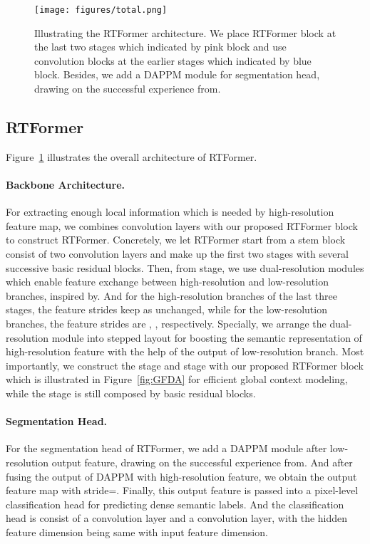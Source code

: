 \documentclass{article}
\begin{document}
\begin{figure}
\texttt{[image: figures/total.png]}
    \caption{Illustrating the RTFormer architecture. We place RTFormer block at the last two stages which indicated by pink block and use convolution blocks at the earlier stages which indicated by blue block. Besides, we add a DAPPM module for segmentation head, drawing on the successful experience from\cite{hong2021deep}.}
    \label{fig:RTFormer}
\end{figure}


\subsection{RTFormer}

Figure~\ref{fig:RTFormer} illustrates the overall architecture of RTFormer.

\vspace{-2mm}
\paragraph{Backbone Architecture.}
For extracting enough local information which is needed by high-resolution feature map, we combines convolution layers with our proposed RTFormer block to construct RTFormer. Concretely, we let RTFormer start from a stem block consist of two  convolution layers and make up the first two stages with several successive basic residual blocks\cite{he2016deep}. Then, from stage, we use dual-resolution modules which enable feature exchange between high-resolution and low-resolution branches, inspired by\cite{hong2021deep}. And for the high-resolution branches of the last three stages, the feature strides keep as  unchanged, while for the low-resolution branches, the feature strides are , ,  respectively. Specially, we arrange the dual-resolution module into stepped layout for boosting the semantic representation of high-resolution feature with the help of the output of low-resolution branch. Most importantly, we construct the stage and stage with our proposed RTFormer block which is illustrated in Figure~\ref{fig:GFDA} for efficient global context modeling, while the stage is still composed by basic residual blocks.

\vspace{-2mm}
\paragraph{Segmentation Head.}
For the segmentation head of RTFormer, we add a DAPPM module after low-resolution output feature, drawing on the successful experience from\cite{hong2021deep}. And after fusing the output of DAPPM with high-resolution feature, we obtain the output feature map with stride=. Finally, this output feature is passed into a pixel-level classification head for predicting dense semantic labels. And the classification head is consist of a  convolution layer and a  convolution layer, with the hidden feature dimension being same with input feature dimension.
\end{document}
